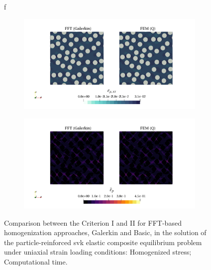 \begin{figure}[hbt]
\begin{subfigure}[b]{0.49\textwidth}
    \caption{}
    \label{subfig:hencky_2D_normal_cpu_time_vs_n_voxels}
  \end{subfigure}
\caption{f}
\label{fig:linear_2D_normal_comparison_crit}
\end{figure}

\begin{figure}[hbt]
\centering
	\begin{subfigure}[b]{\textwidth}
    \centering
    \includegraphics[width=\textwidth]{figures/von_mises_small_strain_2D_normal_strain_11}
    \caption{}
    \label{subfig:svk_2D_ratio_4_normal_strain_11}
  \end{subfigure}
  \begin{subfigure}[b]{\textwidth}
    \centering
    \includegraphics[width=\textwidth]{figures/von_mises_small_strain_2D_normal_e_p}
    \caption{}
    \label{subfig:svk_2D_ratio_-4_normal_strain_11}
  \end{subfigure}
\caption{Comparison between the Criterion I and II for FFT-based homogenization approaches, Galerkin and Basic, in the
solution of the particle-reinforced svk elastic composite equilibrium problem under uniaxial
strain loading conditions:  Homogenized stress;  Computational time.}
\label{fig:svk_3D_normal_comparison_crit}
\end{figure}
